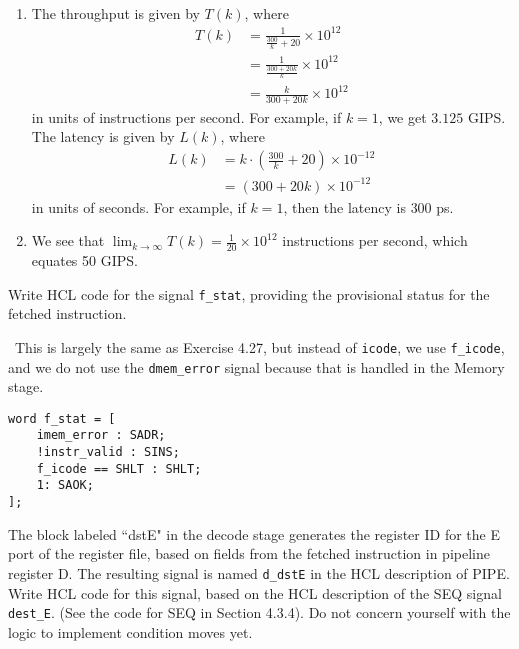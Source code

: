 \documentclass[12pt]{article}
\newenvironment{ex}[2][Exercise]{\begin{trivlist}
		\item[\hskip \labelsep {\bfseries #1}\hskip \labelsep {\bfseries #2.}]}{\end{trivlist}}
\newenvironment{sol}[1][Solution]{\begin{trivlist}
		\item[\hskip \labelsep {\bfseries #1:}]}{\end{trivlist}}
\begin{document}
\begin{sol}
	\
	\begin{enumerate}[label=(\alph*)]
		\item The throughput is given by $T(k)$, where
		\begin{align*}
			T(k)&=\frac{1}{\frac{300}{k}+20}\times 10^{12}\\
			&=\frac{1}{\frac{300+20k}{k}}\times 10^{12}\\
			&=\frac{k}{300+20k}\times 10^{12}
		\end{align*}
		in units of instructions per second. For example, if $k=1$, we get
		$3.125$ GIPS. The latency is given by $L(k)$, where
		\begin{align*}
			L(k)&=k\cdot \left(\frac{300}{k}+20\right)\times 10^{-12}\\
			&=(300+20k)\times 10^{-12}
		\end{align*}
		in units of seconds. For example, if $k=1$, then the latency is
		$300$ ps.
		\item We see that $\lim_{k\to\infty}T(k)=\frac{1}{20}\times 10^{12}$
		instructions per second, which equates 50 GIPS.
	\end{enumerate}
\end{sol}


\begin{ex}{4.30}
	Write HCL code for the signal \texttt{f\_stat}, providing the provisional status
	for the fetched instruction.
\end{ex}

\begin{sol}
	\
	This is largely the same as Exercise 4.27, but instead of \texttt{icode}, we use
	\texttt{f\_icode}, and we do not use the \texttt{dmem\_error} signal because that
	is handled in the Memory stage.
	
	\begin{lstlisting}[language={}]
word f_stat = [
	imem_error : SADR;
	!instr_valid : SINS;
	f_icode == SHLT : SHLT;
	1: SAOK;
];
	\end{lstlisting}
\end{sol}

\begin{ex}{4.31}
	The block labeled ``dstE" in the decode stage generates the register ID for the
	E port of the register file, based on fields from the fetched instruction in pipeline
	register D. The resulting signal is named \texttt{d\_dstE} in the HCL description
	of PIPE. Write HCL code for this signal, based on the HCL description of the SEQ
	signal \texttt{dest\_E}. (See the code for SEQ in Section 4.3.4). Do not concern
	yourself with the logic to implement condition moves yet.
\end{ex}
\end{document}
